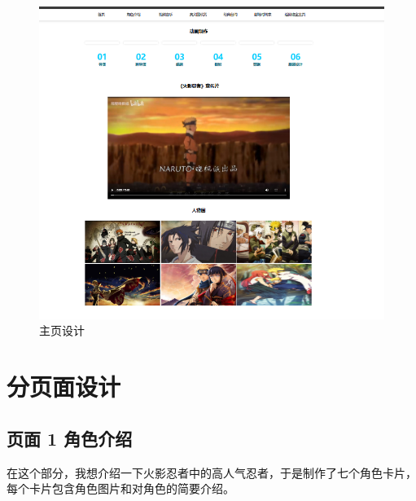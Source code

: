 \documentclass[supercite]{Experimental_Report}
\theoremstyle{definition}
\begin{document}
\begin{figure}[h]
\centering
\includegraphics[scale=0.5]{images/2-1.png}
\caption{主页设计}
\label{fig2-1}
\end{figure}
\newpage

\section{分页面设计}
\subsection{页面 1 角色介绍}
在这个部分，我想介绍一下火影忍者中的高人气忍者，于是制作了七个角色卡片，每个卡片包含角色图片和对角色的简要介绍。
\end{document}
